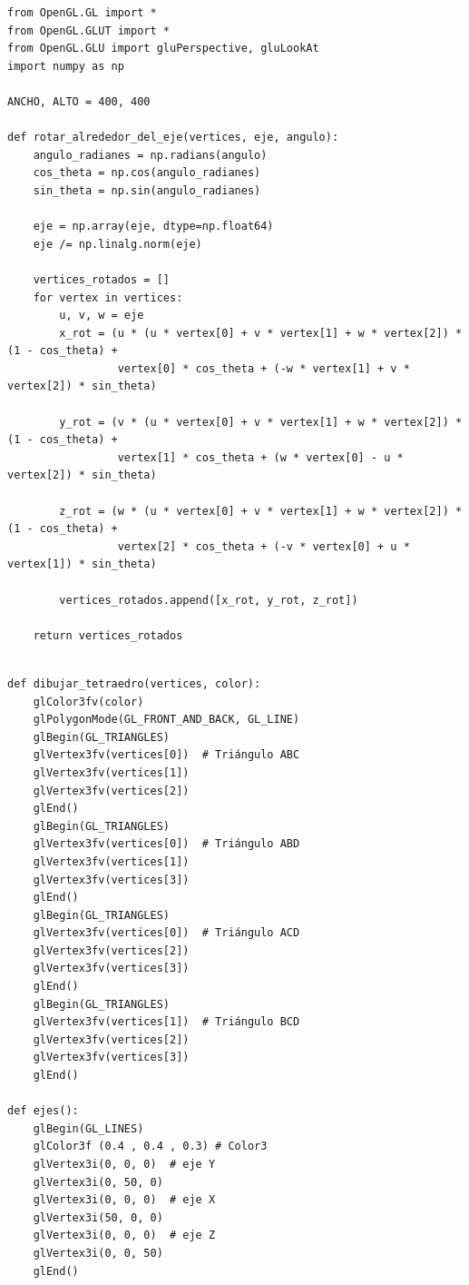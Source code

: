 \documentclass[a4paper]{article}
\begin{document}
\begin{center}
\begin{mycodeboxl}
\begin{lstlisting}
from OpenGL.GL import *
from OpenGL.GLUT import *
from OpenGL.GLU import gluPerspective, gluLookAt
import numpy as np

ANCHO, ALTO = 400, 400

def rotar_alrededor_del_eje(vertices, eje, angulo):
    angulo_radianes = np.radians(angulo)
    cos_theta = np.cos(angulo_radianes)
    sin_theta = np.sin(angulo_radianes)

    eje = np.array(eje, dtype=np.float64)
    eje /= np.linalg.norm(eje)

    vertices_rotados = []
    for vertex in vertices:
        u, v, w = eje
        x_rot = (u * (u * vertex[0] + v * vertex[1] + w * vertex[2]) * (1 - cos_theta) +
                 vertex[0] * cos_theta + (-w * vertex[1] + v * vertex[2]) * sin_theta)
        
        y_rot = (v * (u * vertex[0] + v * vertex[1] + w * vertex[2]) * (1 - cos_theta) +
                 vertex[1] * cos_theta + (w * vertex[0] - u * vertex[2]) * sin_theta)

        z_rot = (w * (u * vertex[0] + v * vertex[1] + w * vertex[2]) * (1 - cos_theta) +
                 vertex[2] * cos_theta + (-v * vertex[0] + u * vertex[1]) * sin_theta)
        
        vertices_rotados.append([x_rot, y_rot, z_rot])

    return vertices_rotados
\end{lstlisting}
\end{mycodeboxl}
\end{center}

\begin{center}
\begin{mycodeboxl}
\begin{lstlisting}

def dibujar_tetraedro(vertices, color):
    glColor3fv(color)
    glPolygonMode(GL_FRONT_AND_BACK, GL_LINE)
    glBegin(GL_TRIANGLES)
    glVertex3fv(vertices[0])  # Triángulo ABC
    glVertex3fv(vertices[1])
    glVertex3fv(vertices[2])
    glEnd()
    glBegin(GL_TRIANGLES)
    glVertex3fv(vertices[0])  # Triángulo ABD
    glVertex3fv(vertices[1])
    glVertex3fv(vertices[3])
    glEnd()
    glBegin(GL_TRIANGLES)
    glVertex3fv(vertices[0])  # Triángulo ACD
    glVertex3fv(vertices[2])
    glVertex3fv(vertices[3])
    glEnd()
    glBegin(GL_TRIANGLES)
    glVertex3fv(vertices[1])  # Triángulo BCD
    glVertex3fv(vertices[2])
    glVertex3fv(vertices[3])
    glEnd()

def ejes():
    glBegin(GL_LINES)
    glColor3f (0.4 , 0.4 , 0.3) # Color3
    glVertex3i(0, 0, 0)  # eje Y
    glVertex3i(0, 50, 0)
    glVertex3i(0, 0, 0)  # eje X
    glVertex3i(50, 0, 0)
    glVertex3i(0, 0, 0)  # eje Z
    glVertex3i(0, 0, 50)
    glEnd()
\end{lstlisting}
\end{mycodeboxl}
\end{center}
\end{document}

